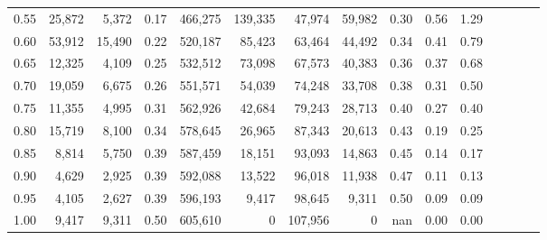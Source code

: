 \begin{tabular}{rrrcrrrrrrrrrrr}
0.55 &  25,872 &   5,372 &                                       0.17 &  466,275 &  139,335 &   47,974 &   59,982 &  0.30 &  0.56 &                         1.29 \\
0.60 &  53,912 &  15,490 &                                       0.22 &  520,187 &   85,423 &   63,464 &   44,492 &  0.34 &  0.41 &                         0.79 \\
0.65 &  12,325 &   4,109 &                                       0.25 &  532,512 &   73,098 &   67,573 &   40,383 &  0.36 &  0.37 &                         0.68 \\
0.70 &  19,059 &   6,675 &                                       0.26 &  551,571 &   54,039 &   74,248 &   33,708 &  0.38 &  0.31 &                         0.50 \\
0.75 &  11,355 &   4,995 &                                       0.31 &  562,926 &   42,684 &   79,243 &   28,713 &  0.40 &  0.27 &                         0.40 \\
0.80 &  15,719 &   8,100 &                                       0.34 &  578,645 &   26,965 &   87,343 &   20,613 &  0.43 &  0.19 &                         0.25 \\
0.85 &   8,814 &   5,750 &                                       0.39 &  587,459 &   18,151 &   93,093 &   14,863 &  0.45 &  0.14 &                         0.17 \\
0.90 &   4,629 &   2,925 &                                       0.39 &  592,088 &   13,522 &   96,018 &   11,938 &  0.47 &  0.11 &                         0.13 \\
0.95 &   4,105 &   2,627 &                                       0.39 &  596,193 &    9,417 &   98,645 &    9,311 &  0.50 &  0.09 &                         0.09 \\
1.00 &   9,417 &   9,311 &                                       0.50 &  605,610 &        0 &  107,956 &        0 &   nan &  0.00 &                         0.00 \\
\bottomrule
\end{tabular}
